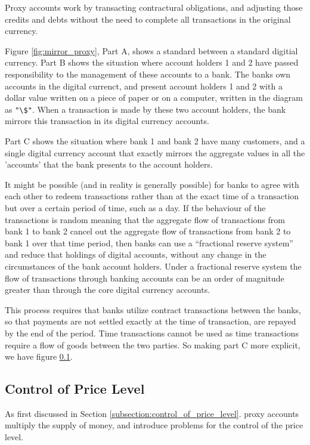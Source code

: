 Proxy accounts work by transacting contractural obligations, and adjusting those credits and debts
without the need to complete all transactions in the original currency. 

Figure \ref{fig:mirror_proxy}, Part A, shows a standard between a standard digitial currency. Part B
shows the situation where account holders 1 and 2 have passed responsibility to the management of these
accounts to a bank. The banks own accounts in the digital currenct, and present account holders 1
and 2 with a dollar value written on a piece of paper or on a computer, written in the diagram as
\verb|"\$"|. When a transaction is made by these two account holders, the bank mirrors this
transaction in its digital currency accounts.

Part C shows the situation where bank 1 and bank 2 have many customers, and a single digital
currency account that exactly mirrors the aggregate values in all the 'accounts' that the bank
presents to the account holders. 

It might be possible (and in reality is generally possible) for banks to agree with each other to
redeem transactions rather than at the exact time of a transaction but over a certain period of
time, such as a day. If the behaviour of the transactions is random meaning that the aggregate flow
of transactions from bank 1 to bank 2 cancel out the aggregate flow of transactions from bank 2 to
bank 1 over that time period, then banks can use a ``fractional reserve system'' and reduce that
holdings of digital accounts, without any change in the circumstances of the bank account holders.
Under a fractional reserve system the flow of transactions through banking accounts can be an order
of magnitude greater than through the core digital currency accounts.

This process requires that banks utilize contract transactions between the banks, so that payments
are not settled exactly at the time of transaction, are repayed by the end of the period. Time
transactions cannot be used as time transactions require a flow of goods between the two parties. So
making part C more explicit, we have figure \ref{}.

\subsection{Control of Price Level}

As first discussed in Section \ref{subsection:control_of_price_level}. proxy accounts multiply the
supply of money, and introduce problems for the control of the price level. 

